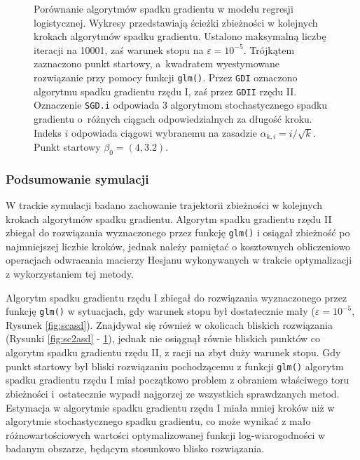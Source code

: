 \begin{figure}[hbt!]
  \caption[Porównanie algorytmów spadku gradientu dla punktu startowego $\beta_0 = (4,3.2)$.]{\label{fig:sc4asd}Porównanie algorytmów spadku gradientu w modelu regresji logistycznej. Wykresy przedstawiają ścieżki zbieżności w kolejnych krokach algorytmów spadku gradientu. Ustalono maksymalną liczbę iteracji na 10001, zaś warunek stopu na $\varepsilon=10^{-5}$. Trójkątem zaznaczono punkt startowy, a~kwadratem wyestymowane rozwiązanie przy pomocy funkcji \texttt{glm()}. Przez \texttt{GDI} oznaczono algorytmu spadku gradientu rzędu I, zaś przez \texttt{GDII} rzędu II. Oznaczenie \texttt{SGD.i} odpowiada 3 algorytmom stochastycznego spadku gradientu o~różnych ciągach odpowiedzialnych za długość kroku. Indeks $i$ odpowiada ciągowi wybranemu na zasadzie $\alpha_{k,i} = i/\sqrt{k}$. Punkt startowy $\beta_0 = (4,3.2)$.}
\end{figure}


\newpage

\subsubsection{Podsumowanie symulacji}
W trackie symulacji badano zachowanie trajektorii zbieżności w kolejnych krokach algorytmów spadku gradientu. Algorytm spadku gradientu rzędu II zbiegał do rozwiązania wyznaczonego przez funkcję \texttt{glm()} i osiągał zbieżność po najmniejszej liczbie kroków, jednak należy pamiętać o kosztownych obliczeniowo operacjach odwracania macierzy Hesjanu wykonywanych w trakcie optymalizacji z wykorzystaniem tej metody. 

Algorytm spadku gradientu rzędu I zbiegał do rozwiązania wyznaczonego przez funkcję \texttt{glm()} w sytuacjach, gdy warunek stopu był dostatecznie mały ($\varepsilon = 10^{-5}$, Rysunek \ref{fig:scasd}). Znajdywał się również w okolicach bliskich rozwiązania (Rysunki \ref{fig:sc2asd} - \ref{fig:sc4asd}), jednak nie osiągnął równie bliskich punktów co algorytm spadku gradientu rzędu II, z racji na zbyt duży warunek stopu. Gdy punkt startowy był bliski rozwiązaniu pochodzącemu z funkcji \texttt{glm()} algorytm spadku gradientu rzędu I miał początkowo problem z obraniem właściwego toru zbieżności i~ostatecznie wypadł najgorzej ze wszystkich sprawdzanych metod. Estymacja w algorytmie spadku gradientu rzędu I miała mniej kroków niż w algorytmie stochastycznego spadku gradientu, co może wynikać z mało różnowartościowych wartości optymalizowanej funkcji log-wiarogodności w badanym obszarze, będącym stosunkowo blisko rozwiązania.

